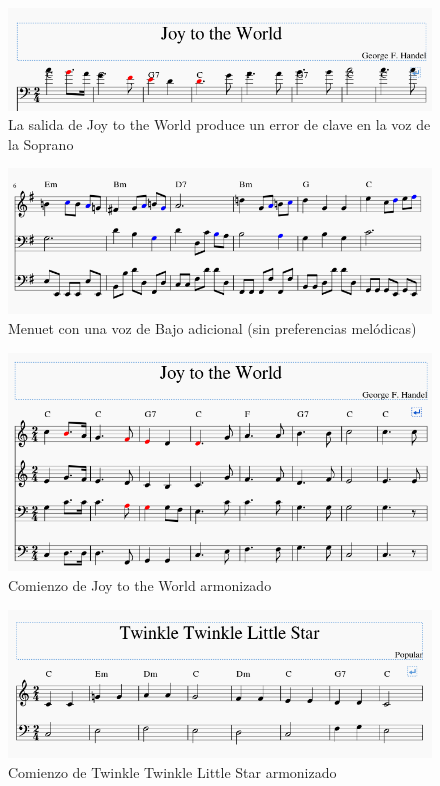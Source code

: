 \begin{figure}
    	\centering
    	\includegraphics[width=0.8\linewidth]{imagenes/evaluation/joy_harm_err.png}
    	\caption{La salida de Joy to the World produce un error de clave en la voz de la Soprano}
    	\label{fig:joy_harm_err}
\end{figure}

\begin{figure}
    	\centering
    	\includegraphics[width=0.8\linewidth]{imagenes/evaluation/menuet_extra_bass.png}
    	\caption{Menuet con una voz de Bajo adicional (sin preferencias melódicas)}
    	\label{fig:menuet_extra_bass}
\end{figure}

\begin{figure}
    	\centering
    	\includegraphics[width=0.8\linewidth]{imagenes/evaluation/joy_harm.png}
    	\caption{Comienzo de Joy to the World armonizado}
    	\label{fig:joy_harm}
\end{figure}

\begin{figure}
     	\centering
     	\includegraphics[width=0.8\linewidth]{imagenes/evaluation/twinkle_harm.png}
     	\caption{Comienzo de Twinkle Twinkle Little Star armonizado}
     	\label{fig:twinkle_harm}
\end{figure}

